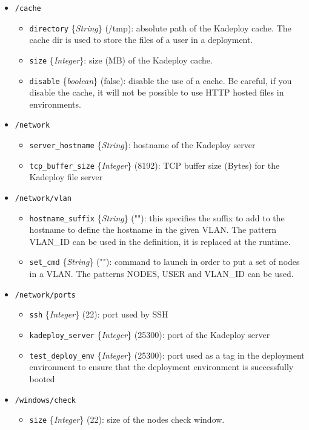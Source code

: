 \documentclass[a4wide,10pt,oneside]{book}
\newcommand{\ypath}[1]{\texttt{#1}}
\newcommand{\yfield}[2]{\texttt{#1} {\small\{{\emph{#2}}\}}:}
\newcommand{\yfieldd}[3]{\texttt{#1} {\small\{{\emph{#2}}\}} {\small(}#3{\small)}:}
\begin{document}
\begin{itemize}
  \item \ypath{/cache}
  \begin{itemize}
    \item \yfieldd{directory}{String}{/tmp} absolute path of the Kadeploy cache. The cache dir is used to store the files of a user in a deployment.
    \item \yfield{size}{Integer} size (MB) of the Kadeploy cache.
    \item \yfieldd{disable}{boolean}{false} disable the use of a cache. Be careful, if you disable the cache, it will not be possible to use HTTP hosted files in environments.
  \end{itemize}

  \item \ypath{/network}
  \begin{itemize}
    \item \yfield{server\_hostname}{String} hostname of the Kadeploy server
    \item \yfieldd{tcp\_buffer\_size}{Integer}{8192} TCP buffer size (Bytes) for the Kadeploy file server
  \end{itemize}

  \item \ypath{/network/vlan}
  \begin{itemize}
    \item \yfieldd{hostname\_suffix}{String}{""} this specifies the suffix to add to the hostname to define the hostname in the given VLAN. The pattern VLAN\_ID can be used in the definition, it is replaced at the runtime.
    \item \yfieldd{set\_cmd}{String}{""} command to launch in order to put a set of nodes in a VLAN. The patterns NODES, USER and VLAN\_ID can be used.
  \end{itemize}

  \item \ypath{/network/ports}
  \begin{itemize}
    \item \yfieldd{ssh}{Integer}{22} port used by SSH
    \item \yfieldd{kadeploy\_server}{Integer}{25300} port of the Kadeploy server
    \item \yfieldd{test\_deploy\_env}{Integer}{25300} port used as a tag in the deployment environment to ensure that the deployment environment is successfully booted
  \end{itemize}

  \item \ypath{/windows/check}
  \begin{itemize}
    \item \yfieldd{size}{Integer}{22} size of the nodes check window.
  \end{itemize}


\end{itemize}
\end{document}
